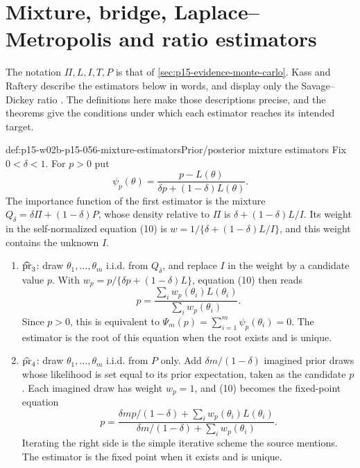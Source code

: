 \section{Mixture, bridge, Laplace--Metropolis and ratio estimators}
\label{sec:p15-w02b-p15-056-further-estimators}

The notation \(\Pi,L,I,T,P\) is that of
\cref{sec:p15-evidence-monte-carlo}. Kass and Raftery describe the
estimators below in words, and display only the Savage--Dickey ratio
\cite[Sec.~4.3, p.~780]{KassRaftery1995BayesFactors}. The definitions
here make those descriptions precise, and the theorems give the
conditions under which each estimator reaches its intended target.

\begin{hbdefinition}{def:p15-w02b-p15-056-mixture-estimators}{Prior/posterior mixture estimators}
Fix \(0<\delta<1\). For \(p>0\) put
\[
 \psi_p(\theta)=\frac{p-L(\theta)}{\delta p+(1-\delta)L(\theta)} .
\]
The importance function of the first estimator is the mixture
\(Q_\delta=\delta\Pi+(1-\delta)P\), whose density relative to \(\Pi\)
is \(\delta+(1-\delta)L/I\). Its weight in the self-normalized equation
(10) is \(w=1/\{\delta+(1-\delta)L/I\}\), and this weight contains the
unknown \(I\).
\begin{enumerate}
\item \(\widehat{\rm pr}_3\): draw \(\theta_1,\ldots,\theta_m\)
i.i.d. from \(Q_\delta\), and replace \(I\) in the weight by a candidate
value \(p\). With \(w_p=p/\{\delta p+(1-\delta)L\}\), equation (10)
then reads
\[
 p=\frac{\sum_iw_p(\theta_i)L(\theta_i)}{\sum_iw_p(\theta_i)} .
\] Since \(p>0\), this is equivalent
to \(\Psi_m(p)=\sum_{i=1}^m\psi_p(\theta_i)=0\). The estimator is the
root of this equation when the root exists and is unique.
\item \(\widehat{\rm pr}_4\): draw \(\theta_1,\ldots,\theta_m\) i.i.d.
from \(P\) only. Add \(\delta m/(1-\delta)\) imagined prior draws whose
likelihood is set equal to its prior expectation, taken as the candidate
\(p\). Each imagined draw has weight \(w_p=1\), and (10) becomes the
fixed-point equation
\[
 p=\frac{\delta mp/(1-\delta)+\sum_iw_p(\theta_i)L(\theta_i)}
         {\delta m/(1-\delta)+\sum_iw_p(\theta_i)} .
\]
Iterating the right side is the simple iterative scheme the source
mentions. The estimator is the fixed point when it exists and is unique.
\end{enumerate}
\end{hbdefinition}

